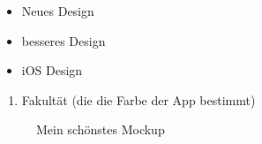 \begin{itemize}
\item Neues Design
\item besseres Design
\item iOS Design
\end{itemize}

\begin{enumerate}
\item Fakultät (die die Farbe der App bestimmt)
\end{enumerate}

\begin{figure}[ht]
	\centering
	\caption{Mein schönstes Mockup}
	\label{fig2}
\end{figure}

